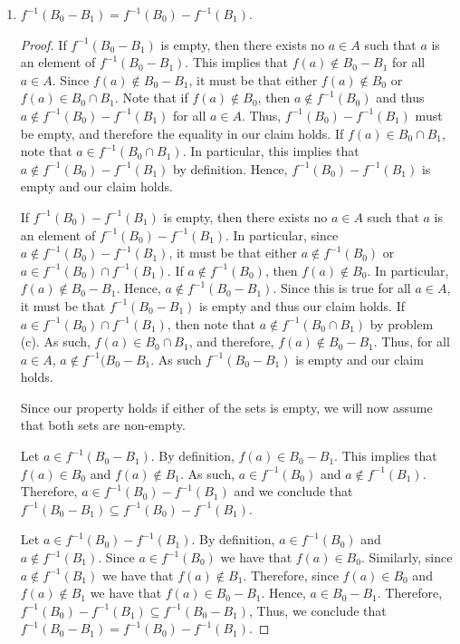 \documentclass[12pt]{article}
\begin{document}
\begin{enumerate}[label=(\alph*)]
\begin{proof}
		Let $a \in f^{-1}(B_0) \cap f^{-1}(B_1)$. Then, it must be that $a \in f^{-1}(B_0)$
		and $a \in f^{-1}(B_1)$. In particular, we have that $f(a) \in B_0$ and 
		$f(a) \in B_1$. Therefore, $f(a) \in B_0 \cap B_1$ which implies that 
		$a \in f^{-1}(B_0 \cap B_1)$. Hence, we conclude that
		$f^{-1}(B_0 \cap B_1) = f^{-1}(B_0) \cap f^{-1}(B_1)$. 
	\end{proof}
	\item $f^{-1}(B_0 - B_1) = f^{-1}(B_0) - f^{-1}(B_1)$.
	\begin{proof}
		If $f^{-1}(B_0 - B_1)$ is empty, then there exists no $a \in A$ such that 
		$a$ is an element of $f^{-1}(B_0 - B_1)$. This implies that $f(a) \notin B_0 - B_1$
		for all $a \in A$. Since $f(a) \notin B_0 - B_1$, it must be that either
		$f(a) \notin B_0$ or $f(a) \in B_0 \cap B_1$. Note that if $f(a) \notin B_0$,
		then $a \notin f^{-1}(B_0)$ and thus $a \notin f^{-1}(B_0) - f^{-1}(B_1)$
		for all $a \in A$. Thus, $f^{-1}(B_0) - f^{-1}(B_1)$ must be empty, and therefore
		the equality in our claim holds. If $f(a) \in B_0 \cap B_1$, note 
		that $a \in f^{-1}(B_0 \cap B_1)$. In particular, this implies that 
		$a \notin f^{-1}(B_0) - f^{-1}(B_1)$ by definition. Hence, $f^{-1}(B_0) -
		f^{-1}(B_1)$ is empty and our claim holds.
		
		If $f^{-1}(B_0) - f^{-1}(B_1)$ is empty, then there exists no $a \in A$ such that
		$a$ is an element of $f^{-1}(B_0) - f^{-1}(B_1)$. In particular, since 
		$a \notin f^{-1}(B_0) - f^{-1}(B_1)$, it must be that either 
		$a \notin f^{-1}(B_0)$ or $a \in f^{-1}(B_0) \cap f^{-1}(B_1)$. If $a \notin
		f^{-1}(B_0)$, then $f(a) \notin B_0$. In particular, $f(a) \notin B_0 - B_1$.
		Hence, $a \notin f^{-1}(B_0 - B_1)$. Since this is true for all $a \in A$,
		it must be that $f^{-1}(B_0 - B_1)$ is empty and thus our claim holds.
		If $a \in f^{-1}(B_0) \cap f^{-1}(B_1)$, then note that $a \notin f^{-1}(B_0 \cap B_1)$
		by problem (c). As such, $f(a) \in B_0 \cap B_1$, and therefore,
		$f(a) \notin B_0 - B_1$. Thus, for all $a \in A$, $a \notin f^{-1}(B_0 - B_1$.
		As such $f^{-1}(B_0 - B_1)$ is empty and our claim holds.
		
		Since our property holds if either of the sets is empty, we will now assume that
		both sets are non-empty.
		
		Let $a \in f^{-1}(B_0 - B_1)$. By definition, $f(a) \in B_0 - B_1$. This implies
		that $f(a) \in B_0$ and $f(a) \notin B_1$. As such, $a \in f^{-1}(B_0)$ and 
		$a \notin f^{-1}(B_1)$. Therefore, $a \in f^{-1}(B_0) - f^{-1}(B_1)$ and we
		conclude that $f^{-1}(B_0 - B_1) \subseteq f^{-1}(B_0) - f^{-1}(B_1)$.
		
		Let $a \in f^{-1}(B_0) - f^{-1}(B_1)$. By definition, $a \in f^{-1}(B_0)$
		and $a \notin f^{-1}(B_1)$. Since $a \in f^{-1}(B_0)$ we have that 
		$f(a) \in B_0$. Similarly, since $a \notin f^{-1}(B_1)$ we have that 
		$f(a) \notin B_1$. Therefore, since $f(a) \in B_0$ and $f(a) \notin B_1$
		we have that $f(a) \in B_0 - B_1$. Hence, $a \in B_0 - B_1$. Therefore,
		$f^{-1}(B_0) - f^{-1}(B_1) \subseteq f^{-1}(B_0 - B_1)$,
		Thus, we conclude that $f^{-1}(B_0 - B_1) = f^{-1}(B_0) - f^{-1}(B_1)$.
	\end{proof}
\end{enumerate}
\end{document}
